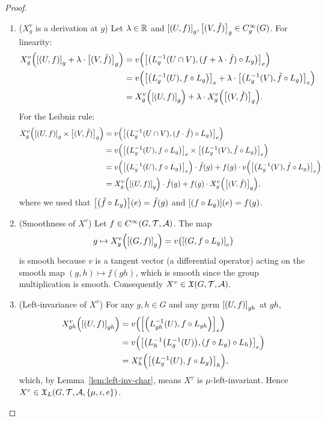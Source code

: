 \documentclass[11pt,reqno]{amsart}
\begin{document}
\begin{proof}
\begin{enumerate}
\begin{enumerate}
\item ($X^v_g$ is a derivation at $g$)
Let $\lambda\in\mathbb{R}$ and
$\SqBr{(U,f)}_{g},\SqBr{(V,\tilde f)}_{g}\in C_{g}^\infty(G)$.
For linearity:
\[\begin{aligned}
X^v_g\Br{\SqBr{(U,f)}_{g}+\lambda\cdot\SqBr{(V,\tilde f)}_{g}}
&=v\Br{\SqBr{\Br{L_g\inv(U\cap V),(f+\lambda\cdot\tilde f)\circ L_g}}_{e}}\\
&=v\Br{\SqBr{\Br{L_g\inv(U),f\circ L_g}}_{e}
+\lambda\cdot\SqBr{\Br{L_g\inv(V),\tilde f\circ L_g}}_{e}}\\
&=X^v_g\Br{\SqBr{(U,f)}_{g}}+\lambda\cdot X^v_g\Br{\SqBr{(V,\tilde f)}_{g}}.
\end{aligned}\]
For the Leibniz rule:
\[\begin{aligned}
X^v_g\Br{\SqBr{(U,f)}_{g}\times\SqBr{(V,\tilde f)}_{g}}
&=v\Br{\SqBr{\Br{L_g\inv(U\cap V),(f\cdot\tilde f)\circ L_g}}_{e}}\\
&=v\Br{
\SqBr{\Br{L_g\inv(U),f\circ L_g}}_{e}
\times
\SqBr{\Br{L_g\inv(V),\tilde f\circ L_g}}_{e}
}\\
&=v\Br{\SqBr{\Br{L_g\inv(U),f\circ L_g}}_{e}}
\cdot\tilde f(g)
+f(g)\cdot
v\Br{\SqBr{\Br{L_g\inv(V),\tilde f\circ L_g}}_{e}}\\
&=X^v_g\Br{\SqBr{(U,f)}_{g}}\cdot\tilde f(g)
+f(g)\cdot X^v_g\Br{\SqBr{(V,\tilde f)}_{g}},
\end{aligned}\]
where we used that $\FUNC{\Br{\tilde f\circ L_g}}{e}=\tilde f(g)$ and
$\FUNC{\Br{f\circ L_g}}{e}=f(g)$.

\item (Smoothness of $X^v$)
Let $f\in C^\infty(G,\mathcal{T},\mathcal{A})$.  The map
\[
g\mapsto X^v_g\Br{\SqBr{(G,f)}_{g}}
=v\Br{\SqBr{\Br{G,f\circ L_g}}_{e}}
\]
is smooth because $v$ is a tangent vector (a differential operator)
acting on the smooth map $(g,h)\mapsto f(gh)$, which is smooth
since the group multiplication is smooth.
Consequently $X^v\in\mathfrak{X}(G,\mathcal{T},\mathcal{A})$.

\item (Left-invariance of $X^v$)
For any $g,h\in G$ and any germ $\SqBr{(U,f)}_{gh}$ at $gh$,
\[\begin{aligned}
X^v_{gh}\Br{\SqBr{(U,f)}_{gh}}
&=v\Br{\SqBr{\Br{L_{gh}\inv(U),f\circ L_{gh}}}_{e}}\\
&=v\Br{\SqBr{\Br{L_h\inv\Br{L_g\inv(U)},
\Br{f\circ L_g}\circ L_h}}_{e}}\\
&=X^v_h\Br{\SqBr{\Br{L_g\inv(U),f\circ L_g}}_{h}},
\end{aligned}\]
which, by Lemma~\ref{lem:left-inv-char}, means $X^v$ is
$\mu$-left-invariant.  Hence $X^v\in\X_L(G,\T,\A,\set{\mu,\iota,e})$.


\end{enumerate}
\end{enumerate}
\end{proof}
\end{document}
